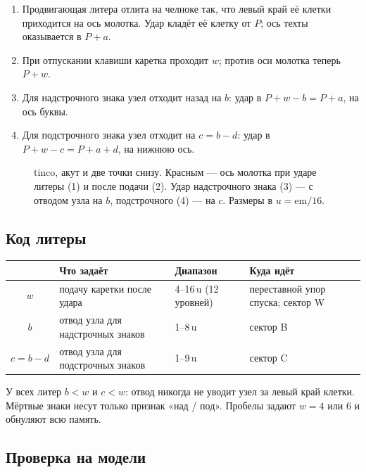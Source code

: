 \begin{enumerate}
  \item Продвигающая литера отлита на челноке так, что левый край её клетки приходится на ось молотка. Удар кладёт её клетку от $P$; ось техты оказывается в $P + a$.
  \item При отпускании клавиши каретка проходит $w$; против оси молотка теперь $P + w$.
  \item Для надстрочного знака узел отходит назад на $b$: удар в $P + w - b = P + a$, на ось буквы.
  \item Для подстрочного знака узел отходит на $c = b - d$: удар в $P + w - c = P + a + d$, на нижнюю ось.
\end{enumerate}

\begin{figure}[h]
\centering
\setlength\tgem{48mm}
\begin{tikzpicture}[x=\tgu,y=\tgu]

\end{tikzpicture}
\caption{tinco, акут и две точки снизу. Красным — ось молотка при ударе литеры (1) и после подачи (2). Удар надстрочного знака (3) — с отводом узла на $b$, подстрочного (4) — на $c$. Размеры в $u = \mathrm{em}/16$.}
\label{fig:geom}
\end{figure}

\subsection{Код литеры}

\begin{center}\small
\begin{tabular}{@{}clll@{}}
\toprule
& Что задаёт & Диапазон & Куда идёт \\
\midrule
$w$ & подачу каретки после удара & 4--16\,u (12 уровней) & переставной упор спуска; сектор W \\
$b$ & отвод узла для надстрочных знаков & 1--8\,u & сектор B \\
$c = b - d$ & отвод узла для подстрочных знаков & 1--9\,u & сектор C \\
\bottomrule
\end{tabular}
\end{center}

У всех литер $b < w$ и $c < w$: отвод никогда не уводит узел за левый край клетки. Мёртвые знаки несут только признак «над / под». Пробелы задают $w = 4$ или $6$ и обнуляют всю память.

\subsection{Проверка на модели}

